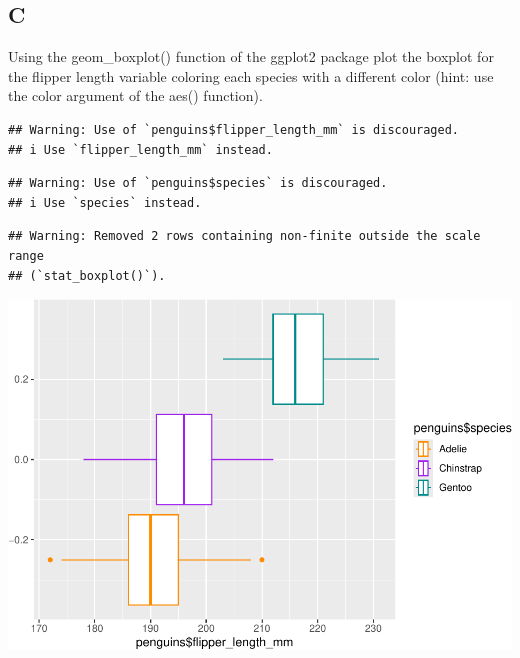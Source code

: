 \documentclass[
]{article}
\newenvironment{Shaded}{\begin{snugshade}}{\end{snugshade}}
\newcommand{\AttributeTok}[1]{\textcolor[rgb]{0.13,0.29,0.53}{#1}}
\newcommand{\FunctionTok}[1]{\textcolor[rgb]{0.13,0.29,0.53}{\textbf{#1}}}
\newcommand{\NormalTok}[1]{#1}
\newcommand{\SpecialCharTok}[1]{\textcolor[rgb]{0.81,0.36,0.00}{\textbf{#1}}}
\newcommand{\StringTok}[1]{\textcolor[rgb]{0.31,0.60,0.02}{#1}}
\begin{document}
\hypertarget{c-2}{%
\subsection{C}\label{c-2}}

Using the geom\_boxplot() function of the ggplot2 package plot the
boxplot for the flipper length variable coloring each species with a
different color (hint: use the color argument of the aes() function).

\begin{Shaded}
\end{Shaded}

\begin{verbatim}
## Warning: Use of `penguins$flipper_length_mm` is discouraged.
## i Use `flipper_length_mm` instead.
\end{verbatim}

\begin{verbatim}
## Warning: Use of `penguins$species` is discouraged.
## i Use `species` instead.
\end{verbatim}

\begin{verbatim}
## Warning: Removed 2 rows containing non-finite outside the scale range
## (`stat_boxplot()`).
\end{verbatim}

\includegraphics{es_files/figure-latex/unnamed-chunk-11-1.pdf}
\end{document}
